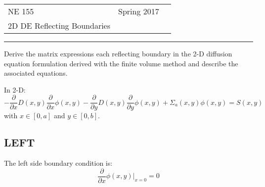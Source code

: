 \documentclass[12pt]{article}
\begin{document}
 

\begin{flushright}
\begin{tabular}{p{5in} r l}
NE 155 & Spring 2017 \\
2D DE Reflecting Boundaries
\end{tabular}
\end{flushright}
\rule[1ex]{\textwidth}{.1pt}

%
%
%


Derive the matrix expressions each reflecting boundary in the 2-D diffusion equation formulation derived with the finite volume method and describe the associated equations. 

In 2-D:
\[-\frac{\partial}{\partial x}D(x,y)\frac{\partial}{\partial x} \phi(x,y) -\frac{\partial}{\partial y}D(x,y)\frac{\partial}{\partial y} \phi(x,y) + \Sigma_a(x,y) \phi(x,y) = S(x,y)\]
%
with $x \in [0,a]$ and $y \in [0,b]$.


\subsection*{LEFT}
The left side boundary condition is:
\[\frac{\partial }{\partial x} \phi(x,y)\big|_{x=0} = 0\]
\end{document}
